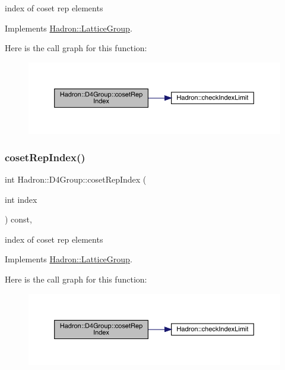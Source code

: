 index of coset rep elements 

Implements \mbox{\hyperlink{structHadron_1_1LatticeGroup_a7e3b9b5e2f596e6c40d64aa939a3ad6c}{Hadron\+::\+Lattice\+Group}}.

Here is the call graph for this function\+:
\nopagebreak
\begin{figure}[H]
\begin{center}
\leavevmode
\includegraphics[width=350pt]{de/d5e/structHadron_1_1D4Group_ae7ebfa25f82987479c33f0d5d769ab2f_cgraph}
\end{center}
\end{figure}
\mbox{\label{structHadron_1_1D4Group_ae7ebfa25f82987479c33f0d5d769ab2f}} 
\subsubsection{\texorpdfstring{cosetRepIndex()}{cosetRepIndex()}\hspace{0.1cm}{\footnotesize\ttfamily [3/3]}}
{\footnotesize\ttfamily int Hadron\+::\+D4\+Group\+::coset\+Rep\+Index (\begin{DoxyParamCaption}\item[{int}]{index }\end{DoxyParamCaption}) const\hspace{0.3cm}{\ttfamily [inline]}, {\ttfamily [virtual]}}

index of coset rep elements 

Implements \mbox{\hyperlink{structHadron_1_1LatticeGroup_a7e3b9b5e2f596e6c40d64aa939a3ad6c}{Hadron\+::\+Lattice\+Group}}.

Here is the call graph for this function\+:
\nopagebreak
\begin{figure}[H]
\begin{center}
\leavevmode
\includegraphics[width=350pt]{de/d5e/structHadron_1_1D4Group_ae7ebfa25f82987479c33f0d5d769ab2f_cgraph}
\end{center}
\end{figure}
\mbox{\label{structHadron_1_1D4Group_a5969c3afe94d4c6ada166f7dc161a355}} 
